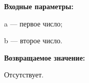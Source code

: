 \textbf{Входные параметры:}

 a --- первое число;
 
 b --- второе число.

\textbf{Возвращаемое значение:}

 Отсутствует.